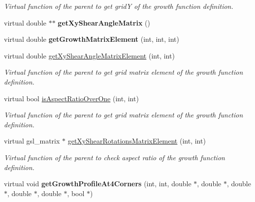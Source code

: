 \begin{DoxyCompactItemize}
\begin{DoxyCompactList}\small\item\em Virtual function of the parent to get grid\+Y of the growth function definition. \end{DoxyCompactList}\item 
\hypertarget{classGrowthFunctionBase_a32e0a776bc81147dc648662440d50b0d}{}virtual double $\ast$$\ast$ {\bfseries get\+Xy\+Shear\+Angle\+Matrix} ()\label{classGrowthFunctionBase_a32e0a776bc81147dc648662440d50b0d}

\item 
\hypertarget{classGrowthFunctionBase_aa70ed3e1b142f733364b8543e26e4ef8}{}virtual double {\bfseries get\+Growth\+Matrix\+Element} (int, int, int)\label{classGrowthFunctionBase_aa70ed3e1b142f733364b8543e26e4ef8}

\item 
\hypertarget{classGrowthFunctionBase_a2dbab9e82dc1b1511df64c9a7cdd2dac}{}virtual double \hyperlink{classGrowthFunctionBase_a2dbab9e82dc1b1511df64c9a7cdd2dac}{get\+Xy\+Shear\+Angle\+Matrix\+Element} (int, int)\label{classGrowthFunctionBase_a2dbab9e82dc1b1511df64c9a7cdd2dac}

\begin{DoxyCompactList}\small\item\em Virtual function of the parent to get grid matrix element of the growth function definition. \end{DoxyCompactList}\item 
\hypertarget{classGrowthFunctionBase_ad3048194d1054d24d56bd4b3f178e802}{}virtual bool \hyperlink{classGrowthFunctionBase_ad3048194d1054d24d56bd4b3f178e802}{is\+Aspect\+Ratio\+Over\+One} (int, int)\label{classGrowthFunctionBase_ad3048194d1054d24d56bd4b3f178e802}

\begin{DoxyCompactList}\small\item\em Virtual function of the parent to get grid matrix element of the growth function definition. \end{DoxyCompactList}\item 
\hypertarget{classGrowthFunctionBase_a3cab7817a6f6d4f117f0c0c14334b0ab}{}virtual gsl\+\_\+matrix $\ast$ \hyperlink{classGrowthFunctionBase_a3cab7817a6f6d4f117f0c0c14334b0ab}{get\+Xy\+Shear\+Rotations\+Matrix\+Element} (int, int)\label{classGrowthFunctionBase_a3cab7817a6f6d4f117f0c0c14334b0ab}

\begin{DoxyCompactList}\small\item\em Virtual function of the parent to check aspect ratio of the growth function definition. \end{DoxyCompactList}\item 
\hypertarget{classGrowthFunctionBase_a7ce876504be72c0ed6d800aed092ac36}{}virtual void {\bfseries get\+Growth\+Profile\+At4\+Corners} (int, int, double $\ast$, double $\ast$, double $\ast$, double $\ast$, double $\ast$, bool $\ast$)\label{classGrowthFunctionBase_a7ce876504be72c0ed6d800aed092ac36}


\end{DoxyCompactItemize}
